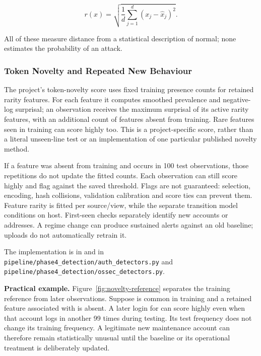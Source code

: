\documentclass[11pt,a4paper]{article}
\newcommand{\tok}[1]{\texttt{\detokenize{#1}}}
\begin{document}
\begin{equation}
\label{eq:6}
r(x)=\sqrt{\frac{1}{d}\sum_{j=1}^{d}(x_j-\hat{x}_j)^2}.
\end{equation}

All of these measure distance from a statistical description of normal; none estimates the probability of an attack.

\subsubsection{Token Novelty and Repeated New Behaviour}\label{sec:novelty}

The project's token-novelty score uses fixed training presence counts for retained rarity features. For each feature it computes smoothed prevalence and negative-log surprisal; an observation receives the maximum surprisal of its active rarity features, with an additional count of features absent from training. Rare features seen in training can score highly too. This is a project-specific score, rather than a literal unseen-line test or an implementation of one particular published novelty method.

If a feature was absent from training and occurs in 100 test observations, those repetitions do not update the fitted counts. Each observation can still score highly and flag against the saved threshold. Flags are not guaranteed: selection, encoding, hash collisions, validation calibration and score ties can prevent them. Feature rarity is fitted per source/view, while the separate transition model conditions on host. First-seen checks separately identify new accounts or addresses. A regime change can produce sustained alerts against an old baseline; uploads do not automatically retrain it.

The implementation is in \tok{fit_rarity} and \tok{rarity_score} in \nolinkurl{pipeline/phase4_detection/auth_detectors.py} and \nolinkurl{pipeline/phase4_detection/ossec_detectors.py}.

\textbf{Practical example.} Figure~\ref{fig:novelty-reference} separates the training reference from later observations. Suppose \tok{backup} is common in training and a retained feature associated with \tok{maint1} is absent. A later login for \tok{maint1} can score highly even when that account logs in another 99 times during testing. Its test frequency does not change its training frequency. A legitimate new maintenance account can therefore remain statistically unusual until the baseline or its operational treatment is deliberately updated.
\end{document}

